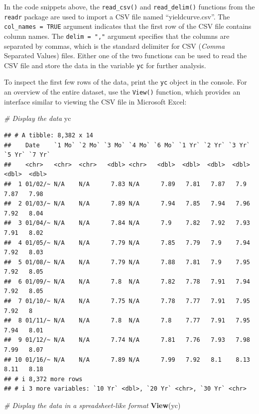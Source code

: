 \documentclass[
]{book}
\newenvironment{Shaded}{\begin{snugshade}}{\end{snugshade}}
\newcommand{\CommentTok}[1]{\textcolor[rgb]{0.56,0.35,0.01}{\textit{#1}}}
\newcommand{\FunctionTok}[1]{\textcolor[rgb]{0.13,0.29,0.53}{\textbf{#1}}}
\newcommand{\NormalTok}[1]{#1}
\begin{document}
In the code snippets above, the \texttt{read\_csv()} and \texttt{read\_delim()} functions from the \texttt{readr} package are used to import a CSV file named ``yieldcurve.csv''. The \texttt{col\_names\ =\ TRUE} argument indicates that the first row of the CSV file contains column names. The \texttt{delim\ =\ ","} argument specifies that the columns are separated by commas, which is the standard delimiter for CSV (\emph{Comma} Separated Values) files. Either one of the two functions can be used to read the CSV file and store the data in the variable \texttt{yc} for further analysis.

To inspect the first few rows of the data, print the \texttt{yc} object in the console. For an overview of the entire dataset, use the \texttt{View()} function, which provides an interface similar to viewing the CSV file in Microsoft Excel:

\begin{Shaded}
\begin{Highlighting}[]
\CommentTok{\# Display the data}
\NormalTok{yc}
\end{Highlighting}
\end{Shaded}

\begin{verbatim}
## # A tibble: 8,382 x 14
##    Date    `1 Mo` `2 Mo` `3 Mo` `4 Mo` `6 Mo` `1 Yr` `2 Yr` `3 Yr` `5 Yr` `7 Yr`
##    <chr>   <chr>  <chr>   <dbl> <chr>   <dbl>  <dbl>  <dbl>  <dbl>  <dbl>  <dbl>
##  1 01/02/~ N/A    N/A      7.83 N/A      7.89   7.81   7.87   7.9    7.87   7.98
##  2 01/03/~ N/A    N/A      7.89 N/A      7.94   7.85   7.94   7.96   7.92   8.04
##  3 01/04/~ N/A    N/A      7.84 N/A      7.9    7.82   7.92   7.93   7.91   8.02
##  4 01/05/~ N/A    N/A      7.79 N/A      7.85   7.79   7.9    7.94   7.92   8.03
##  5 01/08/~ N/A    N/A      7.79 N/A      7.88   7.81   7.9    7.95   7.92   8.05
##  6 01/09/~ N/A    N/A      7.8  N/A      7.82   7.78   7.91   7.94   7.92   8.05
##  7 01/10/~ N/A    N/A      7.75 N/A      7.78   7.77   7.91   7.95   7.92   8   
##  8 01/11/~ N/A    N/A      7.8  N/A      7.8    7.77   7.91   7.95   7.94   8.01
##  9 01/12/~ N/A    N/A      7.74 N/A      7.81   7.76   7.93   7.98   7.99   8.07
## 10 01/16/~ N/A    N/A      7.89 N/A      7.99   7.92   8.1    8.13   8.11   8.18
## # i 8,372 more rows
## # i 3 more variables: `10 Yr` <dbl>, `20 Yr` <chr>, `30 Yr` <chr>
\end{verbatim}

\begin{Shaded}
\begin{Highlighting}[]
\CommentTok{\# Display the data in a spreadsheet{-}like format}
\FunctionTok{View}\NormalTok{(yc)}
\end{Highlighting}
\end{Shaded}
\end{document}
